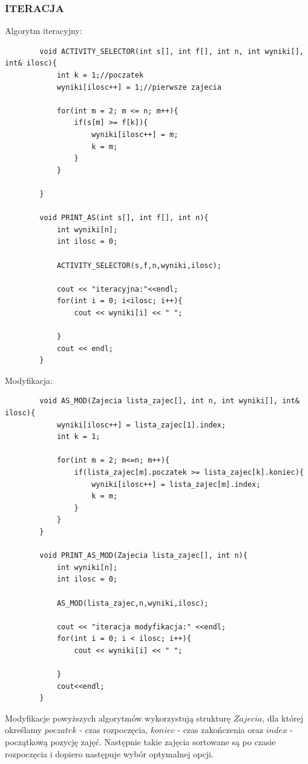 \documentclass{article}
\begin{document}
	\subsubsection*{ITERACJA}
	Algorytm iteracyjny:
	\begin{verbatim}
		void ACTIVITY_SELECTOR(int s[], int f[], int n, int wyniki[], int& ilosc){
			int k = 1;//poczatek
			wyniki[ilosc++] = 1;//pierwsze zajecia
			
			for(int m = 2; m <= n; m++){
				if(s[m] >= f[k]){
					wyniki[ilosc++] = m;
					k = m;
				}
			}
			
		}
		
		void PRINT_AS(int s[], int f[], int n){
			int wyniki[n];
			int ilosc = 0;
			
			ACTIVITY_SELECTOR(s,f,n,wyniki,ilosc);
			
			cout << "iteracyjna:"<<endl;
			for(int i = 0; i<ilosc; i++){
				cout << wyniki[i] << " ";
				
			}
			cout << endl;
		}
	\end{verbatim}
	Modyfikacja:
	\begin{verbatim}
		void AS_MOD(Zajecia lista_zajec[], int n, int wyniki[], int& ilosc){
			wyniki[ilosc++] = lista_zajec[1].index;
			int k = 1;
			
			for(int m = 2; m<=n; m++){
				if(lista_zajec[m].poczatek >= lista_zajec[k].koniec){
					wyniki[ilosc++] = lista_zajec[m].index;
					k = m;
				}
			}
		}
		
		void PRINT_AS_MOD(Zajecia lista_zajec[], int n){
			int wyniki[n];
			int ilosc = 0;
			
			AS_MOD(lista_zajec,n,wyniki,ilosc);
			
			cout << "iteracja modyfikacja:" <<endl;
			for(int i = 0; i < ilosc; i++){
				cout << wyniki[i] << " ";
				
			}
			cout<<endl; 
		}
	\end{verbatim}
	Modyfikacje powyższych algorytmów wykorzystują strukturę $Zajecia$, dla której określamy $poczatek$ - czas rozpoczęcia, $koniec$ - czas zakończenia oraz $index$ - początkową pozycję zajęć. Następnie takie zajęcia sortowane są po czasie rozpoczęcia i dopiero następuje wybór optymalnej opcji.
\end{document}
